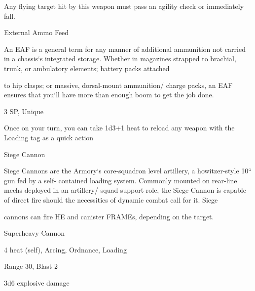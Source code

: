 Any flying target hit by this weapon must pass an agility check or immediately fall.  

External Ammo Feed 
 

An EAF is a general term for any manner of additional ammunition not carried in a chassis‘s integrated  
storage. Whether in magazines strapped to brachial, trunk, or ambulatory elements; battery packs attached  

to hip clasps; or massive, dorsal-mount ammunition/ charge packs, an EAF ensures that you‘ll have more  
than enough boom to get the job done.   

3 SP, Unique
 
Once on your turn, you can take 1d3+1 heat to reload any weapon with the Loading tag as a  
quick action
 

Siege Cannon  

Siege Cannons are the Armory‘s core-squadron level artillery, a howitzer-style 10“ gun fed by a self- 
contained loading system. Commonly mounted on rear-line mechs deployed in an artillery/ squad support  
role, the Siege Cannon is capable of direct fire should the necessities of dynamic combat call for it. Siege  

cannons can fire HE and canister FRAMEs, depending on the target.   

Superheavy Cannon
 
4 heat (self), Arcing, Ordnance, Loading
 
Range 30, Blast 2
 
3d6 explosive damage
 

